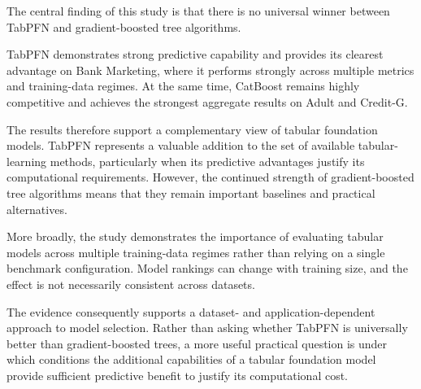 The central finding of this study is that there is no universal winner between TabPFN and gradient-boosted tree algorithms.



TabPFN demonstrates strong predictive capability and provides its clearest advantage on Bank Marketing, where it performs strongly across multiple metrics and training-data regimes. At the same time, CatBoost remains highly competitive and achieves the strongest aggregate results on Adult and Credit-G.



The results therefore support a complementary view of tabular foundation models. TabPFN represents a valuable addition to the set of available tabular-learning methods, particularly when its predictive advantages justify its computational requirements. However, the continued strength of gradient-boosted tree algorithms means that they remain important baselines and practical alternatives.



More broadly, the study demonstrates the importance of evaluating tabular models across multiple training-data regimes rather than relying on a single benchmark configuration. Model rankings can change with training size, and the effect is not necessarily consistent across datasets.



The evidence consequently supports a dataset- and application-dependent approach to model selection. Rather than asking whether TabPFN is universally better than gradient-boosted trees, a more useful practical question is under which conditions the additional capabilities of a tabular foundation model provide sufficient predictive benefit to justify its computational cost.
